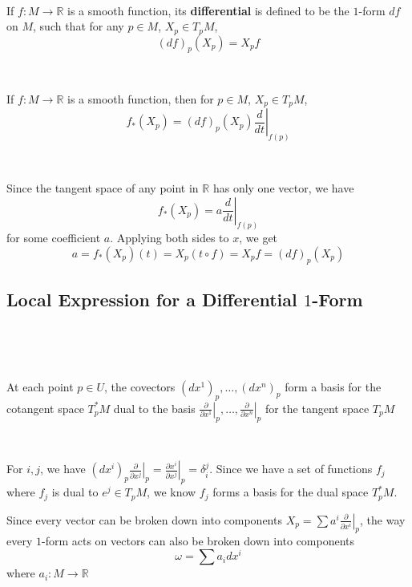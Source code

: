 \documentclass{article}
\begin{document}
\begin{definition}
  \

  If $f: M \to \mathbb{R}$ is a smooth function, its \textbf{differential} is defined to be the $1$-form $df$ on $M$, such that for any $p \in M$, $X_p \in T_pM$, $$(df)_p(X_p) = X_pf$$
\end{definition}

\begin{proposition}
  \

  If $f: M \to \mathbb{R}$ is a smooth function, then for $p \in M$, $X_p \in T_pM$, $$f_*(X_p)= (df)_p(X_p)\left.\frac{d}{dt}\right\vert_{f(p)}$$
\end{proposition}

\begin{customproof}
  \

  Since the tangent space of any point in $\mathbb{R}$ has only one vector, we have$$f_*(X_p) = a \left.\frac{d}{dt}\right\vert_{f(p)}$$for some coefficient $a$. Applying both sides to $x$, we get $$a = f_*(X_p)(t) = X_p(t \circ f) = X_pf = (df)_p(X_p)$$
\end{customproof}

\subsection{Local Expression for a Differential $1$-Form}
\

\begin{proposition}
  \

  At each point $p \in U$, the covectors $(dx^1)_p, \dots, (dx^n)_p$ form a basis for the cotangent space $T_p^*M$ dual to the basis $\left.\frac{\partial}{\partial x^1}\right\vert_p, \dots, \left.\frac{\partial}{\partial x^n}\right\vert_p$ for the tangent space $T_pM$
\end{proposition}

\begin{customproof}
  \

  For $i,j$, we have $(dx^i)_p \left.\frac{\partial}{\partial x^j}\right\vert_p = \left.\frac{\partial x^i}{\partial x^j}\right\vert_p = \delta_i^j$. Since we have a set of functions $f_j$ where $f_j$ is dual to $e^j \in T_pM$, we know $f_j$ forms a basis for the dual space $T_p^*M$.

  Since every vector can be broken down into components $X_p = \sum a^i \left.\frac{\partial}{\partial x^i}\right\vert_p$, the way every $1$-form acts on vectors can also be broken down into components $$\omega = \sum a_i dx^i$$where $a_i: M \to \mathbb{R}$
\end{customproof}
\end{document}

